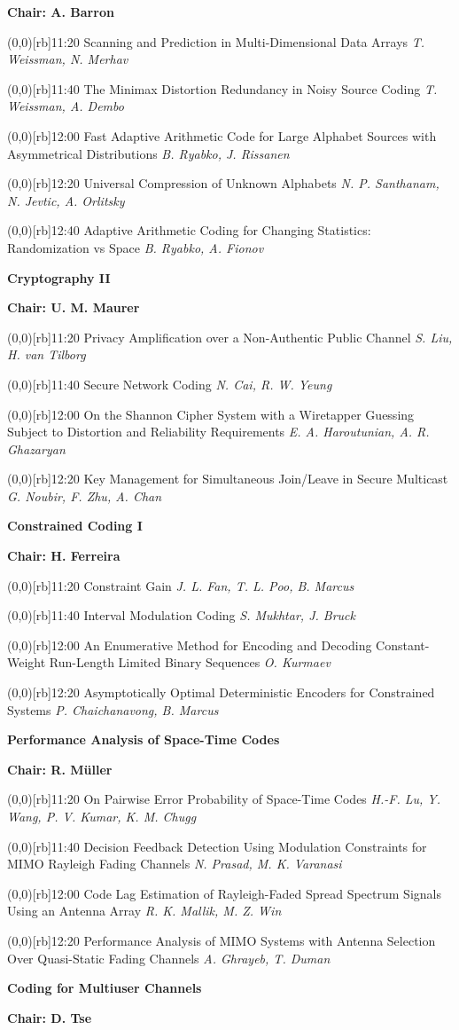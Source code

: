 \documentclass[a5paper,twoside]{article}
\def\sesstitle#1{\vspace{.45\bigskipamount}\par{\bfseries #1}\par}
\def\sesschair#1{{\bfseries Chair: #1}\par\vspace{.65\medskipamount}}
\def\papertime#1{\makebox(0,0)[rb]{{\scriptsize #1}\hspace{.5em}}}
\def\papertitle#1{#1\hfil\break}
\def\paperauthors#1{{\itshape #1}\par\filbreak\vspace{.65\medskipamount}}
\begin{document}
\sesschair{A. Barron}
\papertime{11:20}%
\papertitle{Scanning and Prediction in Multi-Dimensional Data Arrays}
\paperauthors{T. Weissman, N. Merhav}
\papertime{11:40}%
\papertitle{The Minimax Distortion Redundancy in Noisy Source Coding}
\paperauthors{T. Weissman, A. Dembo}
\papertime{12:00}%
\papertitle{Fast Adaptive Arithmetic Code for Large Alphabet Sources with Asymmetrical Distributions}
\paperauthors{B. Ryabko, J. Rissanen}
\papertime{12:20}%
\papertitle{Universal Compression of Unknown Alphabets}
\paperauthors{N. P. Santhanam, N. Jevtic, A. Orlitsky}
\papertime{12:40}%
\papertitle{Adaptive Arithmetic Coding for Changing Statistics: Randomization vs Space}
\paperauthors{B. Ryabko, A. Fionov}
\sesstitle{Cryptography II}
\sesschair{U. M. Maurer}
\papertime{11:20}%
\papertitle{Privacy Amplification over a Non-Authentic Public Channel}
\paperauthors{S. Liu, H. van Tilborg}
\papertime{11:40}%
\papertitle{Secure Network Coding}
\paperauthors{N. Cai, R. W. Yeung}
\papertime{12:00}%
\papertitle{On the Shannon Cipher System with a Wiretapper Guessing Subject to Distortion and Reliability Requirements}
\paperauthors{E. A. Haroutunian, A. R. Ghazaryan}
\papertime{12:20}%
\papertitle{Key Management for Simultaneous Join/Leave in Secure Multicast}
\paperauthors{G. Noubir, F. Zhu, A. Chan}
\sesstitle{Constrained Coding I}
\sesschair{H. Ferreira}
\papertime{11:20}%
\papertitle{Constraint Gain}
\paperauthors{J. L. Fan, T. L. Poo, B. Marcus}
\papertime{11:40}%
\papertitle{Interval Modulation Coding}
\paperauthors{S. Mukhtar, J. Bruck}
\papertime{12:00}%
\papertitle{An Enumerative Method for Encoding and Decoding Constant-Weight Run-Length Limited Binary Sequences}
\paperauthors{O. Kurmaev}
\papertime{12:20}%
\papertitle{Asymptotically Optimal Deterministic Encoders for Constrained Systems}
\paperauthors{P. Chaichanavong, B. Marcus}
\sesstitle{Performance Analysis of Space-Time Codes}
\sesschair{R. M\"uller}
\papertime{11:20}%
\papertitle{On Pairwise Error Probability of Space-Time Codes}
\paperauthors{H.-F. Lu, Y. Wang, P. V. Kumar, K. M. Chugg}
\papertime{11:40}%
\papertitle{Decision Feedback Detection Using Modulation Constraints for MIMO Rayleigh Fading Channels}
\paperauthors{N. Prasad, M. K. Varanasi}
\papertime{12:00}%
\papertitle{Code Lag Estimation of Rayleigh-Faded Spread Spectrum Signals Using an Antenna Array}
\paperauthors{R. K. Mallik, M. Z. Win}
\papertime{12:20}%
\papertitle{Performance Analysis of MIMO Systems with Antenna Selection Over Quasi-Static Fading Channels}
\paperauthors{A. Ghrayeb, T. Duman}
\sesstitle{Coding for Multiuser Channels}
\sesschair{D. Tse}
\end{document}
